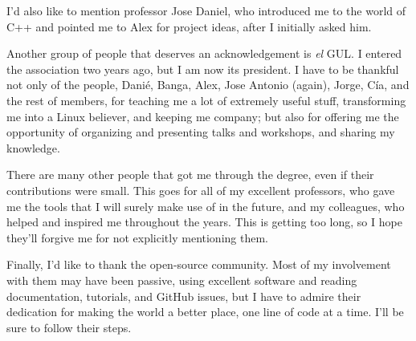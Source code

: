 \documentclass[en]{uc3mthesisIEEE}
\begin{document}
\begin{acknowledgements}
    I'd also like to mention professor Jose Daniel, who introduced me to the world of C++ and pointed me to Alex for project ideas, after I initially asked him.

    Another group of people that deserves an acknowledgement is \textit{el} GUL. I entered the association two years ago, but I am now its president. I have to be thankful not only of the people, Danié, Banga, Alex, Jose Antonio (again), Jorge, Cía, and the rest of members, for teaching me a lot of extremely useful stuff, transforming me into a Linux believer, and keeping me company; but also for offering me the opportunity of organizing and presenting talks and workshops, and sharing my knowledge.

    There are many other people that got me through the degree, even if their contributions were small. This goes for all of my excellent professors, who gave me the tools that I will surely make use of in the future, and my colleagues, who helped and inspired me throughout the years. This is getting too long, so I hope they'll forgive me for not explicitly mentioning them.

    Finally, I'd like to thank the open-source community. Most of my involvement with them may have been passive, using excellent software and reading documentation, tutorials, and GitHub issues, but I have to admire their dedication for making the world a better place, one line of code at a time. I'll be sure to follow their steps.
  \end{acknowledgements}


  \begin{abstract}
    
  \end{abstract}


  \tableofcontents
  \listoffigures
  \listoftables


  \begin{thesis}
  \end{thesis}


  \cleardoublepage
  \label{bibliography}
  \printbibliography[heading=bibintoc,title={References}]


  \cleardoublepage
  \label{glossary}
	\printglossaries


  \begin{appendices}
  \end{appendices}
\end{document}
